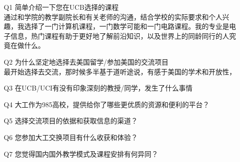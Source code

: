 \documentclass[12pt]{article}
\begin{document}
    \begin{itemize}
        \item [Q1]{
            简单介绍一下您在UCB选择的课程 \\
            通过和学院的教学副院长和有关老师的沟通，结合学校的实际要求和个人兴趣，我选择了一门计算机课程，一门数学可能和一门电路课程。我的专业是电子信息，热门课程有助于更好地了解前沿知识，以及世界上的同龄同行的人究竟在做什么。
        }
        \item [Q2]{
            为什么坚定地选择去美国留学/参加美国的交流项目 \\
            最开始选择去交流，那时候多半基于道听途说，有感于美国的学术和开放性，
            }
        \item [Q3]{
            在UCB/UCI有没有印象深刻的教授/同学，发生了什么事情 \\
            }
        \item [Q4]{
            大工作为985高校，提供给你了哪些更优质的资源和便利的平台？ \\
            }
        \item [Q5]{
            选择交流项目的依据和获取信息的渠道？
            }
        \item [Q6]{
            您参加大工交换项目有什么收获和体验？
            }
        \item [Q7]{
            您觉得国内国外教学模式及课程安排有何异同？
            }
    \end{itemize}
\end{document}
